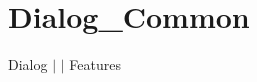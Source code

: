 \chapter{Dialog\+\_\+\+Common }
\hypertarget{md__docs_2_common_2_features_2_dialog___common}{}\label{md__docs_2_common_2_features_2_dialog___common}
Dialog \texorpdfstring{$\vert$}{|}  \texorpdfstring{$\vert$}{|} Features



 
